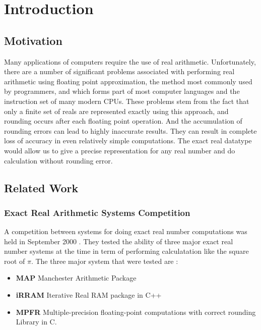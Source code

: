 \documentclass[12pt,twoside,notitlepage]{report}
\begin{document}
\chapter{Introduction}

\section{Motivation}

Many applications of computers require the use of real arithmetic. Unfortunately, there are a number of significant problems associated with performing real arithmetic using floating point approximation, the method most commonly used by programmers, and which forms part of most computer languages and the instruction set of many modern CPUs. These problems stem from the fact that only a finite set of reals are represented exactly using this approach, and rounding occurs after each floating point operation. And the accumulation of rounding errors can lead to highly inaccurate results. They can result in complete loss of accuracy in even relatively simple computations. The exact real datatype would allow us to give a precise representation for any real number and do calculation without rounding error.



\section{Related Work}



\subsection {Exact Real Arithmetic Systems Competition}
A competition between systems for doing exact real number computations was held in September 2000 \cite{blanck}. They tested the ability of three major exact real number systems at the time in term of performing calculatation like the square root of $\pi$. The three major system that were tested are :\\
\begin{itemize}
\item \textbf{MAP} Manchester Arithmetic Package
\item \textbf{iRRAM} Iterative Real RAM package in C++
\item \textbf{MPFR} Multiple-precision floating-point computations with correct rounding Library in C\cite{mpfr}.
\end{itemize}
\end{document}
